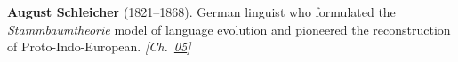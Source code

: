 \textbf{August Schleicher} (1821–1868). German linguist who formulated the \emph{Stammbaumtheorie} model of language evolution and pioneered the reconstruction of Proto-Indo-European. \emph{[Ch.~\hyperref[ch:circlewheel]{05}]}

